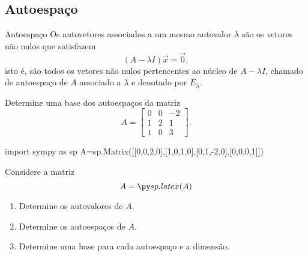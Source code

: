 \subsection*{Autoespaço}
\begin{frame}[label=autovalores]{Autoespaço}
Os autovetores associados a um mesmo autovalor $\lambda$ são os vetores não nulos  que satisfazem
\[(A-\lambda I)\vec{x}=\vec{0},\]
isto é, {\color{red}são todos os vetores não nulos} pertencentes ao {\color{red}núcleo de $A-\lambda I$}, chamado de {\color{blue}autoespaço de $A$ associado a $\lambda$} e denotado por $E_{\lambda}$. 


\begin{exe}
Determine uma base dos autoespaços da  matriz 
\[A=\begin{bmatrix}
0 & 0 & -2\\ 1 & 2 & 1 \\ 1 &0& 3
\end{bmatrix}. \]
\end{exe}
\end{frame}

\begin{frame}[label=autovalores,fragile=singleslide]{}
\begin{casa}
\begin{pycode}
import sympy as sp
A=sp.Matrix([[0,0,2,0],[1,0,1,0],[0,1,-2,0],[0,0,0,1]])
\end{pycode}
Considere a matriz
\[A=
\pyl{A}
\]
\begin{enumerate}
\item Determine os autovalores de $A$.
\item  Determine os autoespaços de $A$.
\item  Determine uma base para cada autoespaço e a dimensão.
\end{enumerate}
\end{casa}
\end{frame}


